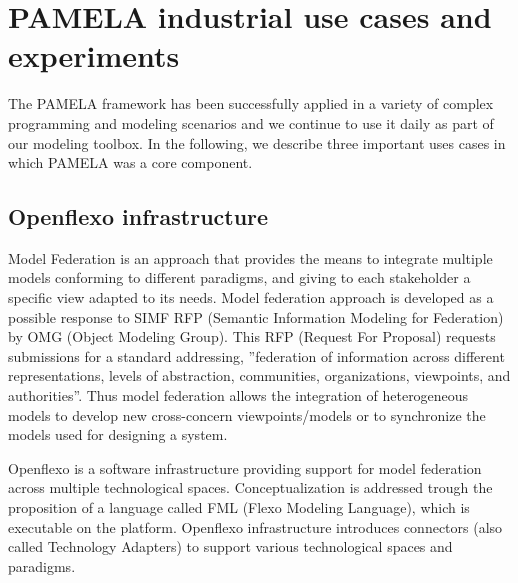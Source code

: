 


\section{PAMELA industrial use cases and experiments}
\label{sec:validation}

 The PAMELA framework has been successfully applied in a variety of complex programming and modeling scenarios and we continue to use it daily as part of our modeling toolbox. In the following, we describe three important uses cases in which PAMELA was a core component.



\subsection{Openflexo infrastructure}

Model Federation is an approach that provides the means to integrate multiple models conforming to different paradigms, and giving to each stakeholder a specific view adapted to its needs. Model federation approach is developed as a possible response to SIMF RFP (Semantic Information Modeling for Federation) by OMG (Object Modeling Group). This RFP (Request For Proposal) requests submissions for a standard addressing, ”federation of information across different representations, levels of abstraction, communities, organizations, viewpoints, and authorities”. Thus model federation allows the integration of heterogeneous models to develop new cross-concern viewpoints/models or to synchronize the models used for designing a system. 

Openflexo\cite{OpenflexoWebSite} is a software infrastructure providing support for model federation across multiple technological spaces. Conceptualization is addressed trough the proposition of a language called FML (Flexo Modeling Language), which is executable on the platform. Openflexo infrastructure introduces connectors (also called Technology Adapters) to support various technological spaces and paradigms.

